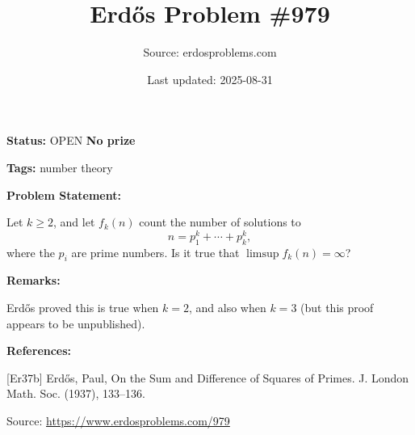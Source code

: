 \documentclass{article}
\title{Erd\H{o}s Problem \#979}
\date{Last updated: 2025-08-31}
\author{Source: erdosproblems.com}
\begin{document}
\maketitle

\noindent\textbf{Status:} OPEN \quad \textbf{No prize}

\noindent\textbf{Tags:} number theory

\medskip
\noindent\textbf{Problem Statement:}

Let $k\geq 2$, and let $f_k(n)$ count the number of solutions to\[n=p_1^k+\cdots+p_k^k,\]where the $p_i$ are prime numbers. Is it true that $\limsup f_k(n)=\infty$?

\bigskip
\noindent\textbf{Remarks:}

Erd\H{o}s \cite{Er37b} proved this is true when $k=2$, and also when $k=3$ (but this proof appears to be unpublished).

\bigskip
\noindent\textbf{References:}

[Er37b] Erd\H{o}s, Paul, On the Sum and {D}ifference of Squares of {P}rimes. J. London Math. Soc. (1937), 133--136.

\bigskip
\noindent\small{Source: \url{https://www.erdosproblems.com/979}}
\end{document}

